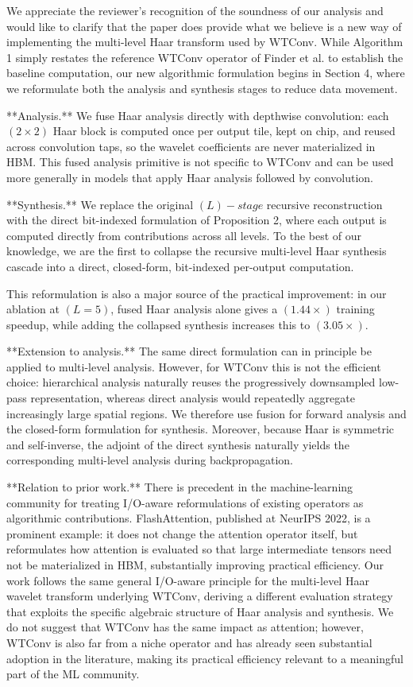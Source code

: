 \documentclass[11pt]{article}
\begin{document}
\begin{markdown}

We appreciate the reviewer’s recognition of the soundness of our analysis and would like to clarify that the paper does provide what we believe is a new way of implementing the multi-level Haar transform used by WTConv. While Algorithm 1 simply restates the reference WTConv operator of Finder et al. to establish the baseline computation, our new algorithmic formulation begins in Section 4, where we reformulate both the analysis and synthesis stages to reduce data movement.

**Analysis.** We fuse Haar analysis directly with depthwise convolution: each $(2\times2)$ Haar block is computed once per output tile, kept on chip, and reused across convolution taps, so the wavelet coefficients are never materialized in HBM. This fused analysis primitive is not specific to WTConv and can be used more generally in models that apply Haar analysis followed by convolution.

**Synthesis.** We replace the original $(L)-stage$ recursive reconstruction with the direct bit-indexed formulation of Proposition 2, where each output is computed directly from contributions across all levels. To the best of our knowledge, we are the first to collapse the recursive multi-level Haar synthesis cascade into a direct, closed-form, bit-indexed per-output computation.

This reformulation is also a major source of the practical improvement: in our ablation at $(L=5)$, fused Haar analysis alone gives a $(1.44\times)$ training speedup, while adding the collapsed synthesis increases this to $(3.05\times)$.

**Extension to analysis.** The same direct formulation can in principle be applied to multi-level analysis. However, for WTConv this is not the efficient choice: hierarchical analysis naturally reuses the progressively downsampled low-pass representation, whereas direct analysis would repeatedly aggregate increasingly large spatial regions. We therefore use fusion for forward analysis and the closed-form formulation for synthesis. Moreover, because Haar is symmetric and self-inverse, the adjoint of the direct synthesis naturally yields the corresponding multi-level analysis during backpropagation.

**Relation to prior work.** There is precedent in the machine-learning community for treating I/O-aware reformulations of existing operators as algorithmic contributions. FlashAttention, published at NeurIPS 2022, is a prominent example: it does not change the attention operator itself, but reformulates how attention is evaluated so that large intermediate tensors need not be materialized in HBM, substantially improving practical efficiency. Our work follows the same general I/O-aware principle for the multi-level Haar wavelet transform underlying WTConv, deriving a different evaluation strategy that exploits the specific algebraic structure of Haar analysis and synthesis. We do not suggest that WTConv has the same impact as attention; however, WTConv is also far from a niche operator and has already seen substantial adoption in the literature, making its practical efficiency relevant to a meaningful part of the ML community.


\end{markdown}
\end{document}
